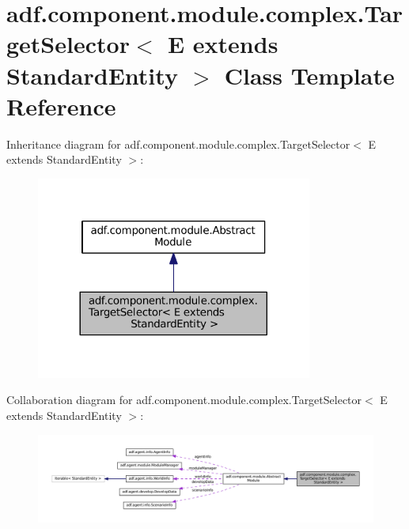 \hypertarget{classadf_1_1component_1_1module_1_1complex_1_1TargetSelector}{}\section{adf.\+component.\+module.\+complex.\+Target\+Selector$<$ E extends Standard\+Entity $>$ Class Template Reference}
\label{classadf_1_1component_1_1module_1_1complex_1_1TargetSelector}


Inheritance diagram for adf.\+component.\+module.\+complex.\+Target\+Selector$<$ E extends Standard\+Entity $>$\+:
\nopagebreak
\begin{figure}[H]
\begin{center}
\leavevmode
\includegraphics[width=257pt]{classadf_1_1component_1_1module_1_1complex_1_1TargetSelector__inherit__graph}
\end{center}
\end{figure}


Collaboration diagram for adf.\+component.\+module.\+complex.\+Target\+Selector$<$ E extends Standard\+Entity $>$\+:
\nopagebreak
\begin{figure}[H]
\begin{center}
\leavevmode
\includegraphics[width=350pt]{classadf_1_1component_1_1module_1_1complex_1_1TargetSelector__coll__graph}
\end{center}
\end{figure}
